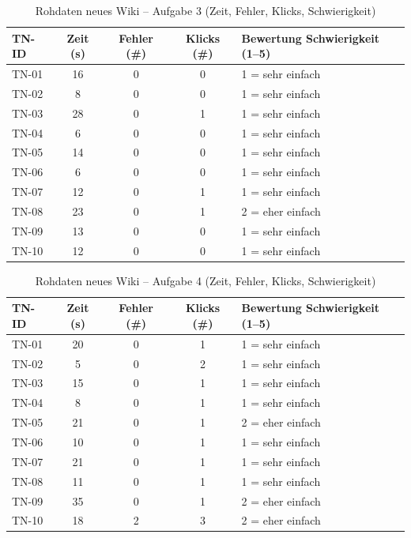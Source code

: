 \begin{table}[H]
\centering
\caption{Rohdaten neues Wiki -- Aufgabe 3 (Zeit, Fehler, Klicks, Schwierigkeit)}
\label{tab:BB-neu-task3}
\begin{tabularx}{\textwidth}{l c c c X}
\toprule
TN-ID & Zeit (s) & Fehler (\#) & Klicks (\#) & Bewertung Schwierigkeit (1--5) \\
\midrule
TN-01 & 16 & 0 & 0 & 1 = sehr einfach \\
TN-02 & 8 & 0 & 0 & 1 = sehr einfach \\
TN-03 & 28 & 0 & 1 & 1 = sehr einfach \\
TN-04 & 6 & 0 & 0 & 1 = sehr einfach \\
TN-05 & 14 & 0 & 0 & 1 = sehr einfach \\
TN-06 & 6 & 0 & 0 & 1 = sehr einfach \\
TN-07 & 12 & 0 & 1 & 1 = sehr einfach \\
TN-08 & 23 & 0 & 1 & 2 = eher einfach \\
TN-09 & 13 & 0 & 0 & 1 = sehr einfach \\
TN-10 & 12 & 0 & 0 & 1 = sehr einfach \\
\bottomrule
\end{tabularx}
\end{table}

\begin{table}[H]
\centering
\caption{Rohdaten neues Wiki -- Aufgabe 4 (Zeit, Fehler, Klicks, Schwierigkeit)}
\label{tab:BB-neu-task4}
\begin{tabularx}{\textwidth}{l c c c X}
\toprule
TN-ID & Zeit (s) & Fehler (\#) & Klicks (\#) & Bewertung Schwierigkeit (1--5) \\
\midrule
TN-01 & 20 & 0 & 1 & 1 = sehr einfach \\
TN-02 & 5 & 0 & 2 & 1 = sehr einfach \\
TN-03 & 15 & 0 & 1 & 1 = sehr einfach \\
TN-04 & 8 & 0 & 1 & 1 = sehr einfach \\
TN-05 & 21 & 0 & 1 & 2 = eher einfach \\
TN-06 & 10 & 0 & 1 & 1 = sehr einfach \\
TN-07 & 21 & 0 & 1 & 1 = sehr einfach \\
TN-08 & 11 & 0 & 1 & 1 = sehr einfach \\
TN-09 & 35 & 0 & 1 & 2 = eher einfach \\
TN-10 & 18 & 2 & 3 & 2 = eher einfach \\
\bottomrule
\end{tabularx}
\end{table}

